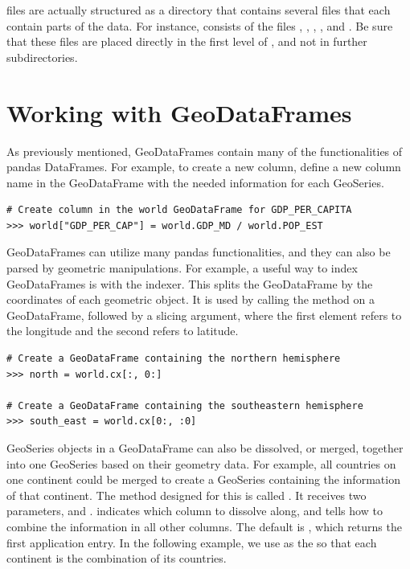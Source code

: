 \begin{info}
 files are actually structured as a directory that contains several files that each contain parts of the data.
For instance,  consists of the files , , , , and .
Be sure that these files are placed directly in the first level of , and not in further subdirectories.\\
\end{info}

\section*{Working with GeoDataFrames} %

As previously mentioned, GeoDataFrames contain many of the functionalities of pandas DataFrames.
For example, to create a new column, define a new column name in the GeoDataFrame with the needed information for each GeoSeries.

\begin{lstlisting}
# Create column in the world GeoDataFrame for GDP_PER_CAPITA
>>> world["GDP_PER_CAP"] = world.GDP_MD / world.POP_EST
\end{lstlisting}

GeoDataFrames can utilize many pandas functionalities, and they can also be parsed by geometric manipulations.
For example, a useful way to index GeoDataFrames is with the  indexer.
This splits the GeoDataFrame by the coordinates of each geometric object.
It is used by calling the method  on a GeoDataFrame, followed by a slicing argument, where the first element refers to the longitude and the second refers to latitude.

\begin{lstlisting}
# Create a GeoDataFrame containing the northern hemisphere
>>> north = world.cx[:, 0:]

# Create a GeoDataFrame containing the southeastern hemisphere
>>> south_east = world.cx[0:, :0]
\end{lstlisting}

GeoSeries objects in a GeoDataFrame can also be dissolved, or merged, together into one GeoSeries based on their geometry data.
For example, all countries on one continent could be merged to create a GeoSeries containing the information of that continent.
The method designed for this is called .
It receives two parameters,  and .
 indicates which column to dissolve along, and  tells how to combine the information in all other columns.
The default  is , which returns the first application entry.
In the following example, we use  as the  so that each continent is the combination of its countries.

